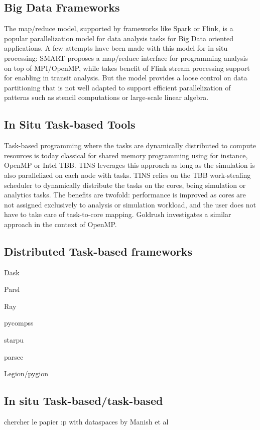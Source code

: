 \subsection{Big Data Frameworks}

The map/reduce model, supported by frameworks like Spark or Flink, is a popular parallelization model for data analysis tasks for Big Data oriented applications.
A few attempts have been made with this model for in situ processing: SMART\cite{wang_smart_2015} proposes a map/reduce interface for programming analysis on top of MPI/OpenMP, while \cite{zanuz_-transit_2018_flink} takes benefit of Flink stream processing support for enabling in transit analysis.
But the model provides a loose control on data partitioning that is not well adapted to support efficient parallelization of patterns such as stencil computations\cite{arrayUDF-SC2018} or large-scale linear algebra.


\subsection{In Situ Task-based Tools}
Task-based programming where the tasks are dynamically distributed to compute resources is today classical for shared memory programming using for instance, OpenMP or Intel TBB.
TINS\cite{yokota_tins_2018} leverages this approach as long as the simulation is also parallelized on each node with tasks.
TINS relies on the TBB work-stealing scheduler to dynamically distribute the tasks on the cores, being simulation or analytics tasks.
The benefits are twofold: performance is improved as cores are not assigned exclusively to analysis or simulation workload, and the user does not have to take care of task-to-core mapping.
Goldrush investigates a similar approach in the context of OpenMP\cite{zheng2013goldrush}.


\subsection{Distributed Task-based frameworks}

Dask 

Parsl 

Ray

pycompss

starpu

parsec

Legion/pygion


\subsection{In situ Task-based/task-based}
chercher le papier :p
with dataspaces by Manish et al
